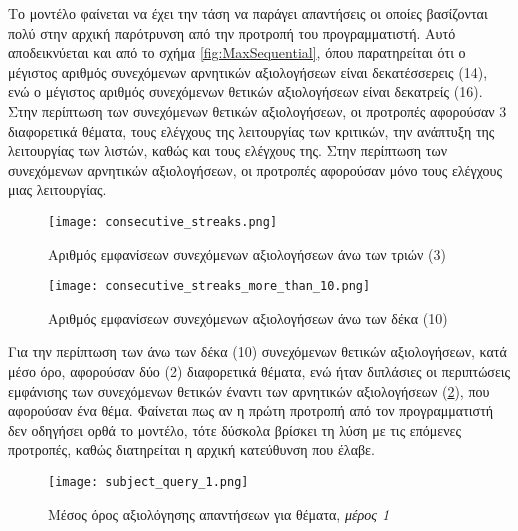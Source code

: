   Το μοντέλο φαίνεται να έχει την τάση να παράγει απαντήσεις οι οποίες
  βασίζονται πολύ στην αρχική παρότρυνση από την προτροπή του
  προγραμματιστή. Αυτό αποδεικνύεται και από το σχήμα
  \ref{fig:MaxSequential}, όπου παρατηρείται ότι ο μέγιστος αριθμός
  συνεχόμενων αρνητικών αξιολογήσεων είναι δεκατέσσερεις (14), ενώ ο
  μέγιστος αριθμός συνεχόμενων θετικών αξιολογήσεων είναι δεκατρείς (16).
  Στην περίπτωση των συνεχόμενων θετικών αξιολογήσεων, οι προτροπές
  αφορούσαν 3 διαφορετικά θέματα, τους ελέγχους της λειτουργίας των
  κριτικών, την ανάπτυξη της λειτουργίας των λιστών, καθώς και τους
  ελέγχους της. Στην περίπτωση των συνεχόμενων αρνητικών αξιολογήσεων, οι
  προτροπές αφορούσαν μόνο τους ελέγχους μιας λειτουργίας.

  \begin{figure}[H]
    \begin{center}
      \texttt{[image: consecutive\_streaks.png]}
      \caption{Αριθμός εμφανίσεων συνεχόμενων αξιολογήσεων άνω των τριών
      (3)}
    \end{center}
    \label{fig:ConsecutiveStreaks}
  \end{figure}

  \begin{figure}[H]
    \begin{center}
      \texttt{[image: consecutive\_streaks\_more\_than\_10.png]}
      \caption{Αριθμός εμφανίσεων συνεχόμενων αξιολογήσεων άνω των δέκα
      (10)}
    \end{center}
    \label{fig:ConsecutiveStreaks10}
  \end{figure}

  Για την περίπτωση των άνω των δέκα (10) συνεχόμενων θετικών
  αξιολογήσεων, κατά μέσο όρο, αφορούσαν δύο (2) διαφορετικά θέματα, ενώ
  ήταν διπλάσιες οι περιπτώσεις εμφάνισης των συνεχόμενων θετικών έναντι
  των αρνητικών αξιολογήσεων (\ref{fig:ConsecutiveStreaks10}), που
  αφορούσαν ένα θέμα. Φαίνεται πως αν η πρώτη προτροπή από τον
  προγραμματιστή δεν οδηγήσει ορθά το μοντέλο, τότε δύσκολα βρίσκει τη
  λύση με τις επόμενες προτροπές, καθώς διατηρείται η αρχική κατεύθυνση
  που έλαβε.

  \begin{figure}[H]
    \begin{center}
      \texttt{[image: subject\_query\_1.png]}
      \caption{Μέσος όρος αξιολόγησης απαντήσεων για θέματα, \textit{μέρος
      1}}
    \end{center}
    \label{fig:SubjectQuery1}
  \end{figure}

